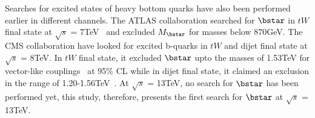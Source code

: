 Searches for excited states of heavy bottom quarks have also been performed earlier in different channels.
The ATLAS collaboration searched for $\bstar$ in $tW$ final state at $\sqrt{s}$ = 7\unit{TeV}~\cite{Aad:2013rna} and excluded $M_{\bstar}$ for masses below 870\unit{GeV}.
The CMS collaboration have looked for excited b-quarks in $tW$ and dijet final state at $\sqrt{s}$ = 8\unit{TeV}. In $tW$ final state, it excluded
$\bstar$ upto the masses of 1.53\unit{TeV} for vector-like couplings~\cite{Khachatryan:2015mta} at 95$\%$ CL while in
dijet final state, it claimed an exclusion in the range of
1.20-1.56\unit{TeV}~\cite{Khachatryan:2015sja}. At $\sqrt{s}$ = 13\unit{TeV}, no search for $\bstar$ has been performed yet, this study, therefore, presents the
first search for $\bstar$ at $\sqrt{s}$ = 13\unit{TeV}. 





  

